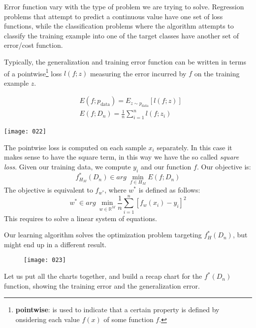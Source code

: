 Error function vary with the type of problem we are trying to solve. Regression problems that attempt to predict a continuous value have one set of loss functions, while the classification problems where the algorithm attempts to classify the training example into one of the target classes have another set of error/cost function.

Typically, the generalization and training error function can be written in terms of a pointwise\footnote{\textbf{pointwise}: is used to indicate that a certain property is defined by onsidering each value \(f(x)\) of some function \(f\).} loss \(l(f; z)\) measuring the error incurred by \(f\) on the training example \(z\).

\begin{align}
    &E(f; p_{\text{data}}) = E_{z \sim p_{\text{data}}}[l(f;z)]\\
    &E(f;D_n) = \frac 1 n \sum^n_{i=1}l(f;z_i)
\end{align}

\begin{figure}[h]

\label{fig:022}
\end{figure}
\begin{example}
\begin{center}
    \texttt{[image: 022]}
\end{center}
The pointwise loss is computed on each sample \(x_i\) separately. In this case it makes sense to have the square term, in this way we have the so called \emph{square loss}. Given our training data, we compute \(y_i\) and our function \(f\). Our objective is:
\[f^*_{H_M}(D_n) \in arg\ \min_{f \in H_M} E(f;D_n)\]
The objective is equivalent to \(f_{w^*}\), where \(w^*\) is defined as follows:
\[w^* \in arg\ \min_{w \in \mathbb{R}^M} \frac 1 n \sum^n_{i=1} [f_w(x_i)-y_i]^2\]
This requires to solve a linear system of equations.

\end{example}

Our learning algorithm solves the optimization problem targeting \(f_H^*(D_n)\), but might end up in a different result.
\begin{figure}[h]
\begin{center}
    \texttt{[image: 023]}
    \caption{}
    \label{fig:023}
\end{center}
\end{figure}

Let us put all the charts together, and build a recap chart for the \(f^*(D_n)\) function, showing the training error and the generalization error.

